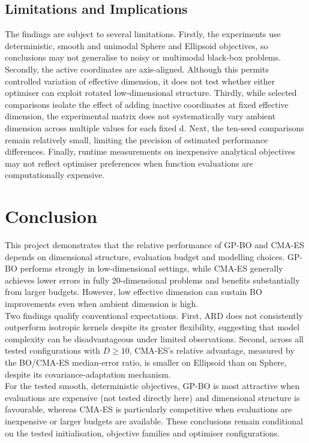 \documentclass[11pt]{article}
\begin{document}
\subsection{Limitations and Implications}
The findings are subject to several limitations. Firstly, the experiments use deterministic, smooth and unimodal Sphere and Ellipsoid objectives, so conclusions may not generalise to noisy or multimodal black-box problems. Secondly, the active coordinates are axis-aligned. Although this permits controlled variation of effective dimension, it does not test whether either optimiser can exploit rotated low-dimensional structure. Thirdly, while selected comparisons isolate the effect of adding inactive coordinates at fixed effective dimension, the experimental matrix does not systematically vary ambient dimension across multiple values for each fixed d. Next, the ten-seed comparisons remain relatively small, limiting the precision of estimated performance differences. Finally, runtime measurements on inexpensive analytical objectives may not reflect optimiser preferences when function evaluations are computationally expensive.

\section{Conclusion}
This project demonstrates that the relative performance of GP-BO and CMA-ES depends on dimensional structure, evaluation budget and modelling choices. GP-BO performs strongly in low-dimensional settings, while CMA-ES generally achieves lower errors in fully 20-dimensional problems and benefits substantially from larger budgets. However, low effective dimension can sustain BO improvements even when ambient dimension is high. \\

\noindent Two findings qualify conventional expectations. First, ARD does not consistently outperform isotropic kernels despite its greater flexibility, suggesting that model complexity can be disadvantageous under limited observations. Second, across all tested configurations with $D\geq10$, CMA-ES's relative advantage, measured by the BO/CMA-ES median-error ratio, is smaller on Ellipsoid than on Sphere, despite its covariance-adaptation mechanism. \\

\noindent For the tested smooth, deterministic objectives, GP-BO is most attractive when evaluations are expensive (not tested directly here) and dimensional structure is favourable, whereas CMA-ES is particularly competitive when evaluations are inexpensive or larger budgets are available. These conclusions remain conditional on the tested initialisation, objective families and optimiser configurations.
\end{document}
